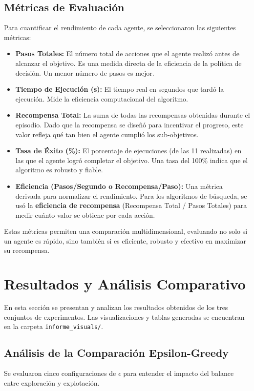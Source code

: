 \documentclass[12pt, oneside, openany]{book}
\begin{document}
\subsection{Métricas de Evaluación}
Para cuantificar el rendimiento de cada agente, se seleccionaron las siguientes métricas:
\begin{itemize}
    \item \textbf{Pasos Totales:} El número total de acciones que el agente realizó antes de alcanzar el objetivo. Es una medida directa de la eficiencia de la política de decisión. Un menor número de pasos es mejor.
    \item \textbf{Tiempo de Ejecución (s):} El tiempo real en segundos que tardó la ejecución. Mide la eficiencia computacional del algoritmo.
    \item \textbf{Recompensa Total:} La suma de todas las recompensas obtenidas durante el episodio. Dado que la recompensa se diseñó para incentivar el progreso, este valor refleja qué tan bien el agente cumplió los sub-objetivos.
    \item \textbf{Tasa de Éxito (\%):} El porcentaje de ejecuciones (de las 11 realizadas) en las que el agente logró completar el objetivo. Una tasa del 100\% indica que el algoritmo es robusto y fiable.
    \item \textbf{Eficiencia (Pasos/Segundo o Recompensa/Paso):} Una métrica derivada para normalizar el rendimiento. Para los algoritmos de búsqueda, se usó la \textbf{eficiencia de recompensa} (Recompensa Total / Pasos Totales) para medir cuánto valor se obtiene por cada acción.
\end{itemize}

Estas métricas permiten una comparación multidimensional, evaluando no solo si un agente es rápido, sino también si es eficiente, robusto y efectivo en maximizar su recompensa.

\section{Resultados y Análisis Comparativo}
\label{sec:resultados}

En esta sección se presentan y analizan los resultados obtenidos de los tres conjuntos de experimentos. Las visualizaciones y tablas generadas se encuentran en la carpeta \texttt{informe\_visuals/}.

\subsection{Análisis de la Comparación Epsilon-Greedy}
Se evaluaron cinco configuraciones de $\epsilon$ para entender el impacto del balance entre exploración y explotación.
\end{document}

